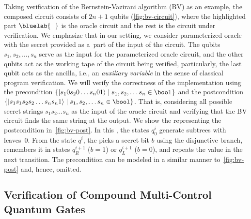 Taking verification of the Bernstein-Vazirani algorithm (BV) as an example, the
composed circuit consists of $2n+1$ qubits (\cref{fig:bv-circuit}), where the
highlighted part $\bluelab{\ \ }$ is the oracle circuit and the rest is the circuit under verification.
We emphasize that in our setting, we consider parameterized oracle with the
secret provided as a~part of the input of the circuit.
The qubits $s_1,s_2,\ldots, s_n$ serve as the input for the parameterized oracle circuit, and the other qubits act as the working tape of the circuit being verified, particularly, the last qubit acts as the ancilla, i.e., an \emph{auxiliary variable} in the sense of classical program verification.
We will verify the correctness of the implementation using the precondition
$\{\ket{s_10s_20\ldots s_n01}\mid s_1,s_2,\ldots s_n\in \bool\}$ and the
postcondition $\{\ket{s_1s_1s_2s_2\ldots s_ns_n1}\mid s_1,s_2,\ldots s_n\in
\bool\}$.
That is, considering all possible secret strings $s_1s_2\ldots s_n$ as the input
of the oracle circuit and verifying that the BV circuit finds the same string at the output.
We show the \lsta representing the postcondition in~\cref{fig:bv-post}.
In this \lsta, the states $q_0^i$ generate subtrees with leaves~$0$. 
From the state $q^i$, the \lsta picks a secret bit $b$ using the disjunctive branch, remembers it in states $q_R^{i+1}$ ($b=1$) or $q_L^{i+1}$ ($b=0$), and repeats the value in the next transition.
The precondition can be modeled in a similar manner to~\cref{fig:bv-post} and,
hence, omitted. 

\figBVpost  %



\vspace{-0.0mm}
\subsection{Verification of Compound Multi-Control Quantum Gates}\label{sec:multi-control}
\vspace{-0.0mm}

\figMCToffoli  %

